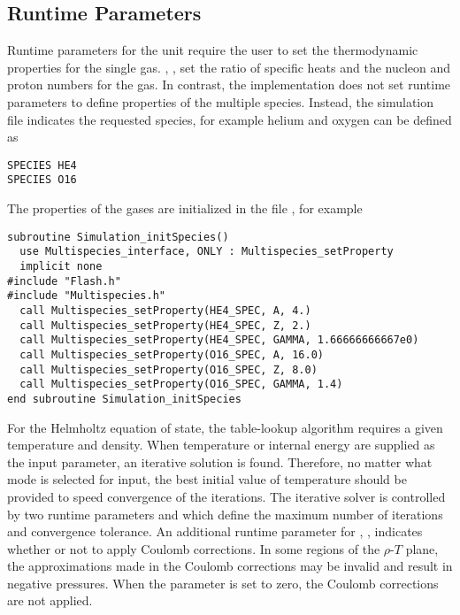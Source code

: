 \subsection{Runtime Parameters}
\label{Sec:Eos Runtime Parameters}
Runtime parameters for the  unit require the user to set the
thermodynamic properties for the single gas.  ,
,  set the ratio of specific
heats and the nucleon and proton numbers for the gas.  In contrast, the
 implementation does not set runtime parameters to define
properties of the multiple species.  Instead, the simulation  file
indicates the requested species, for example helium and oxygen can be defined as
\begin{center}
\begin{verbatim}
SPECIES HE4
SPECIES O16
\end{verbatim}
\end{center}
The properties of the gases are initialized in the file ,
for example
\begin{center}
\begin{verbatim}
subroutine Simulation_initSpecies()
  use Multispecies_interface, ONLY : Multispecies_setProperty
  implicit none
#include "Flash.h"
#include "Multispecies.h"
  call Multispecies_setProperty(HE4_SPEC, A, 4.)
  call Multispecies_setProperty(HE4_SPEC, Z, 2.)
  call Multispecies_setProperty(HE4_SPEC, GAMMA, 1.66666666667e0)
  call Multispecies_setProperty(O16_SPEC, A, 16.0)
  call Multispecies_setProperty(O16_SPEC, Z, 8.0)
  call Multispecies_setProperty(O16_SPEC, GAMMA, 1.4)
end subroutine Simulation_initSpecies
\end{verbatim}
\end{center}


For the Helmholtz equation of state, the table-lookup algorithm requires
a given temperature and density. When temperature or internal energy are supplied
as the input parameter, an iterative solution is found.
Therefore, no matter what mode is selected for  input, the best
 initial value of temperature should be provided to speed convergence of the iterations.
The iterative solver is controlled by two runtime parameters  and
 which define the maximum number of iterations
and convergence tolerance.
An additional runtime parameter for , ,
indicates whether or not to apply Coulomb corrections. In some
regions of the $\rho$-$T$ plane, the approximations made in the
Coulomb corrections may be invalid and result in negative pressures.
When the parameter  is set to zero,
the Coulomb corrections are not applied.

